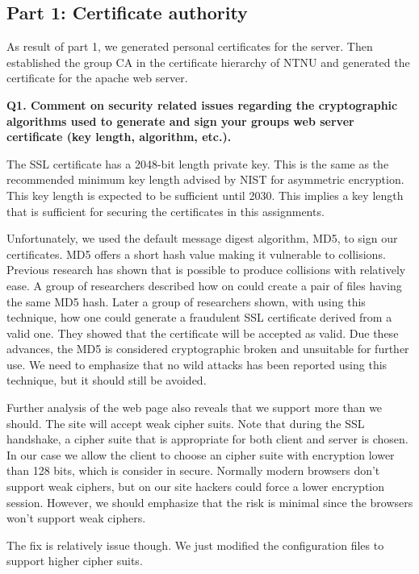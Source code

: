
\subsection {Part 1: Certificate authority}

As result of part 1, we generated personal certificates for the server. Then established the group CA in the certificate hierarchy of NTNU and generated the certificate for the apache web server. 
\newline

\noindent
{\bf Q1. Comment on security related issues regarding the cryptographic algorithms used to generate and sign your groups web server certificate (key length, algorithm, etc.).}
\newline

\noindent
The SSL certificate has a 2048-bit length private key. This is the same as the recommended minimum key length advised by NIST for asymmetric encryption. This key length is expected to be sufficient until 2030. \cite{nisc}This implies a key length that is sufficient for securing the certificates in this assignments. 
\newline

\noindent
Unfortunately, we used the default message digest algorithm, MD5, to sign our certificates. MD5 offers a short hash value making it vulnerable to collisions. Previous research has shown that is possible to produce collisions with relatively ease. A group of researchers described how on could create a pair of files having the same MD5 hash. Later a group of researchers shown, with using this technique, how one could generate a fraudulent SSL certificate derived from a valid one. They showed that the certificate will be accepted as valid. Due these advances, the MD5 is considered cryptographic broken and unsuitable for further use. We need to emphasize that no wild attacks has been reported using this technique, but it should still be avoided. \cite {md5Wiki, md5Networking}
\newline

\noindent
Further analysis of the web page also reveals that we support more than we should. The site will accept weak cipher suits. Note that during the SSL handshake, a cipher suite that is appropriate for both client and server is chosen. In our case we allow the client to choose an cipher suite with encryption lower than 128 bits, which is consider in secure. Normally modern browsers don't support weak ciphers, but on our site hackers could force a lower encryption session. However, we should emphasize that the risk is minimal since the browsers won't support weak ciphers. \cite {cipher}
\newline

\noindent
The fix is relatively issue though. We just modified the configuration files to support higher cipher suits.  






